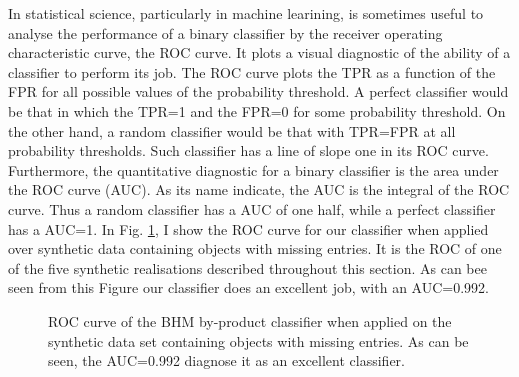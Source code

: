In statistical science, particularly in machine learining, is sometimes useful to analyse the performance of a binary classifier by the receiver operating characteristic curve, the ROC curve. It plots a visual diagnostic of the ability of a classifier to perform its job. The ROC curve plots the TPR as a function of the FPR for all possible values of the probability threshold. A perfect classifier would be that in which the TPR=1 and the FPR=0 for some probability threshold. On the other hand, a random classifier would be that with TPR=FPR at all probability thresholds. Such classifier has a line of slope one in its ROC curve. Furthermore, the quantitative diagnostic for a binary classifier is the area under the ROC curve (AUC). As its name indicate, the AUC is the integral of the ROC curve. Thus a random classifier has a AUC of one half, while a perfect classifier has a AUC=1. In Fig. \ref{fig:ROC}, I show the ROC curve for our classifier when applied over synthetic data containing objects with missing entries. It is the ROC of one of the five synthetic realisations described throughout this section. As can bee seen from this Figure our classifier does an excellent job, with an AUC=0.992.

\begin{figure}[!htp]
\begin{center}
\caption{ROC curve of the BHM by-product classifier when applied on the synthetic data set containing objects with missing entries. As can be seen, the AUC=0.992 diagnose it as an excellent classifier.}
\label{fig:ROC}
\end{center}
\end{figure}

